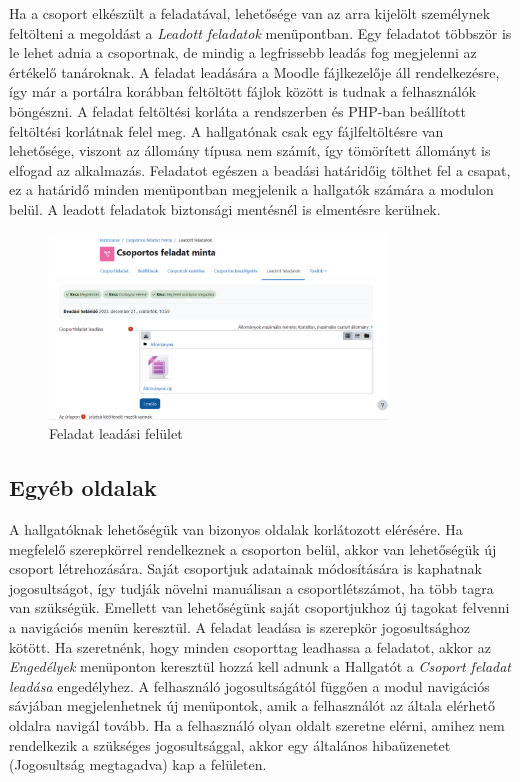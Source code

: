 Ha a csoport elkészült a feladatával, lehetősége van az arra kijelölt személynek feltölteni a megoldást a \textit{Leadott feladatok} menüpontban. Egy feladatot többször is le lehet adnia a csoportnak, de mindig a legfrissebb leadás fog megjelenni az értékelő tanároknak. A feladat leadására a Moodle fájlkezelője áll rendelkezésre, így már a portálra korábban feltöltött fájlok között is tudnak a felhasználók böngészni. A feladat feltöltési korláta a rendszerben és PHP-ban beállított feltöltési korlátnak felel meg. A hallgatónak csak egy fájlfeltöltésre van lehetősége, viszont az állomány típusa nem számít, így tömörített állományt is elfogad az alkalmazás. Feladatot egészen a beadási határidőig tölthet fel a csapat, ez a határidő minden menüpontban megjelenik a hallgatók számára a modulon belül. A leadott feladatok biztonsági mentésnél is elmentésre kerülnek.
\begin{figure}[H]
	\centering
	\includegraphics[width=0.8\textwidth, frame]{images/feladat.png}
	\caption{Feladat leadási felület}
\end{figure}

\subsection{Egyéb oldalak}

A hallgatóknak lehetőségük van bizonyos oldalak korlátozott elérésére. Ha megfelelő szerepkörrel rendelkeznek a csoporton belül, akkor van lehetőségük új csoport létrehozására. Saját csoportjuk adatainak módosítására is kaphatnak jogosultságot, így tudják növelni manuálisan a csoportlétszámot, ha több tagra van szükségük. Emellett van lehetőségünk saját csoportjukhoz új tagokat felvenni a navigációs menün keresztül. A feladat leadása is szerepkör jogosultsághoz kötött. Ha szeretnénk, hogy minden csoporttag leadhassa a feladatot, akkor az \textit{Engedélyek} menüponton keresztül hozzá kell adnunk a Hallgatót a \textit{Csoport feladat leadása} engedélyhez. A felhasználó jogosultságától függően a modul navigációs sávjában megjelenhetnek új menüpontok, amik a felhasználót az általa elérhető oldalra navigál tovább. Ha a felhasználó olyan oldalt szeretne elérni, amihez nem rendelkezik a szükséges jogosultsággal, akkor egy általános hibaüzenetet (Jogosultság megtagadva) kap a felületen.

